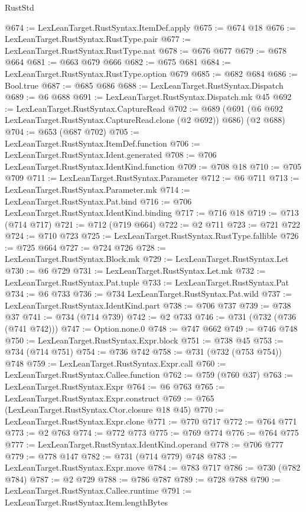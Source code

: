 \begin{lexlean}{RustStd}
\begin{coremodule}
@674 := LexLeanTarget.RustSyntax.ItemDef.apply
@675 := @674 @18
@676 := LexLeanTarget.RustSyntax.RustType.pair
@677 := LexLeanTarget.RustSyntax.RustType.nat
@678 := @676 @677
@679 := @678 @664
@681 := @663 @679 @666
@682 := @675 @681
@684 := LexLeanTarget.RustSyntax.RustType.option @679
@685 := @682 @684
@686 := Bool.true
@687 := @685 @686
@688 := LexLeanTarget.RustSyntax.Dispatch
@689 := @6 @688
@691 := LexLeanTarget.RustSyntax.Dispatch.mk @45
@692 := LexLeanTarget.RustSyntax.CaptureRead
@702 := @689 (@691 (@6 @692 LexLeanTarget.RustSyntax.CaptureRead.clone (@2 @692)) @686) (@2 @688)
@704 := @653 (@687 @702)
@705 := LexLeanTarget.RustSyntax.ItemDef.function
@706 := LexLeanTarget.RustSyntax.Ident.generated
@708 := @706 LexLeanTarget.RustSyntax.IdentKind.function
@709 := @708 @18
@710 := @705 @709
@711 := LexLeanTarget.RustSyntax.Parameter
@712 := @6 @711
@713 := LexLeanTarget.RustSyntax.Parameter.mk
@714 := LexLeanTarget.RustSyntax.Pat.bind
@716 := @706 LexLeanTarget.RustSyntax.IdentKind.binding
@717 := @716 @18
@719 := @713 (@714 @717)
@721 := @712 (@719 @664)
@722 := @2 @711
@723 := @721 @722
@724 := @710 @723
@725 := LexLeanTarget.RustSyntax.RustType.fallible
@726 := @725 @664
@727 := @724 @726
@728 := LexLeanTarget.RustSyntax.Block.mk
@729 := LexLeanTarget.RustSyntax.Let
@730 := @6 @729
@731 := LexLeanTarget.RustSyntax.Let.mk
@732 := LexLeanTarget.RustSyntax.Pat.tuple
@733 := LexLeanTarget.RustSyntax.Pat
@734 := @6 @733
@736 := @734 LexLeanTarget.RustSyntax.Pat.wild
@737 := LexLeanTarget.RustSyntax.IdentKind.part
@738 := @706 @737
@739 := @738 @37
@741 := @734 (@714 @739)
@742 := @2 @733
@746 := @731 (@732 (@736 (@741 @742)))
@747 := Option.none.{0}
@748 := @747 @662
@749 := @746 @748
@750 := LexLeanTarget.RustSyntax.Expr.block
@751 := @738 @45
@753 := @734 (@714 @751)
@754 := @736 @742
@758 := @731 (@732 (@753 @754)) @748
@759 := LexLeanTarget.RustSyntax.Expr.call
@760 := LexLeanTarget.RustSyntax.Callee.function
@762 := @759 (@760 @37)
@763 := LexLeanTarget.RustSyntax.Expr
@764 := @6 @763
@765 := LexLeanTarget.RustSyntax.Expr.construct
@769 := @765 (LexLeanTarget.RustSyntax.Ctor.closure @18 @45)
@770 := LexLeanTarget.RustSyntax.Expr.clone
@771 := @770 @717
@772 := @764 @771
@773 := @2 @763
@774 := @772 @773
@775 := @769 @774
@776 := @764 @775
@777 := LexLeanTarget.RustSyntax.IdentKind.operand
@778 := @706 @777
@779 := @778 @147
@782 := @731 (@714 @779) @748
@783 := LexLeanTarget.RustSyntax.Expr.move
@784 := @783 @717
@786 := @730 (@782 @784)
@787 := @2 @729
@788 := @786 @787
@789 := @728 @788
@790 := LexLeanTarget.RustSyntax.Callee.runtime
@791 := LexLeanTarget.RustSyntax.Item.lengthBytes

\end{coremodule}
\end{lexlean}
